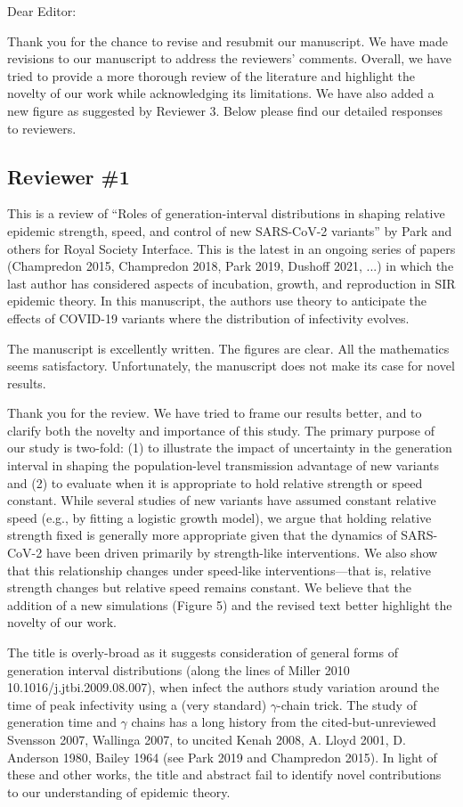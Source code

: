 \documentclass[12pt]{article}
\newcommand{\rev}{\subsection*}
\newcommand{\revtext}{\textsf}
\begin{document}
\noindent Dear Editor:

Thank you for the chance to revise and resubmit our manuscript. 
We have made revisions to our manuscript to address the reviewers' comments.
Overall, we have tried to provide a more thorough review of the literature and highlight the novelty of our work while acknowledging its limitations.
We have also added a new figure as suggested by Reviewer 3.
Below please find our detailed responses to reviewers.

\rev{Reviewer \#1}

\revtext{This is a review of ``Roles of generation-interval distributions in shaping relative epidemic strength, speed, and control of new SARS-CoV-2 variants'' by Park and others for Royal Society Interface.  This is the latest in an ongoing series of papers (Champredon 2015, Champredon 2018, Park 2019, Dushoff 2021, ...) in which the last author has considered aspects of incubation, growth, and reproduction in SIR epidemic theory.  In this manuscript, the authors use theory to anticipate the effects of COVID-19 variants where the distribution of infectivity evolves.}

\revtext{The manuscript is excellently written. The figures are clear.  All the mathematics seems satisfactory.  Unfortunately, the manuscript does not make its case for novel results.}

Thank you for the review.
We have tried to frame our results better, and to clarify both the novelty and importance of this study.
The primary purpose of our study is two-fold: (1) to illustrate the impact of uncertainty in the generation interval in shaping the population-level transmission advantage of new variants and (2) to evaluate when it is appropriate to hold relative strength or speed constant.
While several studies of new variants have assumed constant relative speed (e.g., by fitting a logistic growth model), we argue that holding relative strength fixed is generally more appropriate given that the dynamics of SARS-CoV-2 have been driven primarily by strength-like interventions.
We also show that this relationship changes under speed-like interventions---that is, relative strength changes but relative speed remains constant.
We believe that the addition of a new simulations (Figure 5) and the revised text better highlight the novelty of our work.

\revtext{The title is overly-broad as it suggests consideration of general forms of generation interval distributions (along the lines of Miller 2010 10.1016/j.jtbi.2009.08.007), when infect the authors study variation around the time of peak infectivity using a (very standard) $\gamma$-chain trick.  The study of generation time and $\gamma$ chains has a long history from the cited-but-unreviewed Svensson 2007, Wallinga 2007, to uncited Kenah 2008, A.  Lloyd 2001, D. Anderson 1980, Bailey 1964 (see Park 2019 and Champredon 2015).  In light of these and other works, the title and abstract fail to identify novel contributions to our understanding of epidemic theory.}
\end{document}
